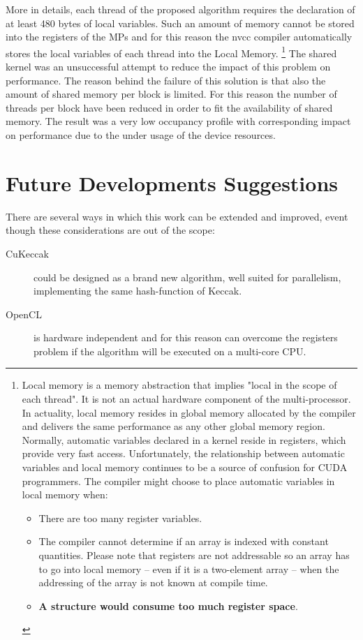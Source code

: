 More in details, each thread of the proposed algorithm requires the declaration of at least 480 bytes of local variables. Such an amount of memory cannot be stored into the registers of the MPs and for this reason the nvcc compiler automatically stores the local variables of each thread into the Local Memory. \footnote{Local memory is a memory abstraction that implies "local in the scope of each thread". It is not an actual hardware component of the multi-processor. In actuality, local memory resides in global memory allocated by the compiler and delivers the same performance as any other global memory region. Normally, automatic variables declared in a kernel reside in registers, which provide very fast access. Unfortunately, the relationship between automatic variables and local memory continues to be a source of confusion for CUDA programmers. The compiler might choose to place automatic variables in local memory when:
\begin{itemize}
\item There are too many register variables.
\item The compiler cannot determine if an array is indexed with constant quantities. Please note that registers are not addressable so an array has to go into local memory -- even if it is a two-element array -- when the addressing of the array is not known at compile time.
\item \textbf{A structure would consume too much register space}.
\end{itemize}}
The shared kernel was an unsuccessful attempt to reduce the impact of this problem on performance. The reason behind the failure of this solution is that also the amount of shared memory per block is limited. For this reason the number of threads per block have been reduced in order to fit the availability of shared memory. The result was a very low occupancy profile with corresponding impact on performance due to the under usage of the device resources.

\section{Future Developments Suggestions}
There are several ways in which this work can be extended and improved, event though these considerations are out of the scope:
\begin{description}
\item [CuKeccak] could be designed as a brand new algorithm, well suited for parallelism, implementing the same hash-function of Keccak.
\item [OpenCL] is hardware independent and for this reason can overcome the registers problem if the algorithm will be executed on a multi-core CPU. 
\end{description}
